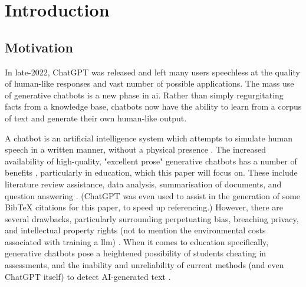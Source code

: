\chapter{Introduction}



\section{Motivation} %
\label{sec:intro_motivation}

In late-2022, ChatGPT was released and left many users speechless at the quality of human-like responses and vast number of possible applications. The mass use of generative chatbots is a new phase in \acrfull{ai}. Rather than simply regurgitating facts from a knowledge base, chatbots now have the ability to learn from a corpus of text and generate their own human-like output.

A chatbot is an artificial intelligence system which attempts to simulate human speech in a written manner, without a physical presence \citep{Nee2023ExploringTT}. The increased availability of high-quality, "excellent prose" generative chatbots has a number of benefits \citep{Floridi}, particularly in education, which this paper will focus on. These include literature review assistance, data analysis, summarisation of documents, and question answering \citep{lund2023chatting}. (ChatGPT was even used to assist in the generation of some BibTeX citations for this paper, to speed up referencing.) However, there are several drawbacks, particularly surrounding perpetuating bias, breaching privacy, and intellectual property rights (not to mention the environmental costs associated with training a \acrfull{llm}) \citep{Jungherr, Bender21}. When it comes to education specifically, generative chatbots pose a heightened possibility of students cheating in assessments, and the inability and unreliability of current methods (and even ChatGPT itself) to detect AI-generated text \citep{susnjak2022, Cotton}.

